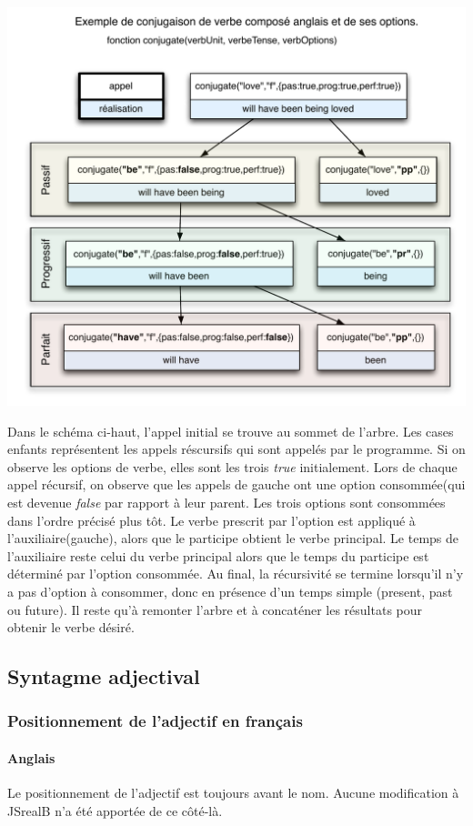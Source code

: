 \documentclass[11pt]{article} %
\newcommand{\system}[1]{\textsf{#1}}
\newcommand{\JSB}{\system{JSrealB}}
\begin{document}
\includegraphics[scale=0.7]{love-conjOptions}

\small{Dans le schéma ci-haut, l'appel initial se trouve au sommet de l'arbre. Les 
cases enfants représentent les appels réscursifs qui sont appelés par le programme.
Si on observe les options de verbe, elles sont les trois \emph{true} initialement. Lors de
chaque appel récursif, on observe que les appels de gauche ont une option consommée(qui est devenue
\emph{false} par rapport à leur parent. Les trois options sont consommées dans l'ordre précisé plus tôt. 
Le verbe prescrit par l'option est appliqué à l'auxiliaire(gauche), alors que le participe obtient le verbe 
principal. Le temps de l'auxiliaire reste celui du verbe principal alors que le temps du participe est déterminé
 par l'option consommée. Au final, la récursivité se termine lorsqu'il n'y a pas d'option à consommer, donc en
présence d'un temps simple (present, past ou future). Il reste qu'à remonter l'arbre et à concaténer les résultats
pour obtenir le verbe désiré.}

\subsection{Syntagme adjectival}
\subsubsection{Positionnement de l'adjectif en français}
\paragraph{Anglais} Le positionnement de l'adjectif est toujours avant le nom. 
Aucune modification à \JSB{} n'a été apportée de ce côté-là.
\end{document}
